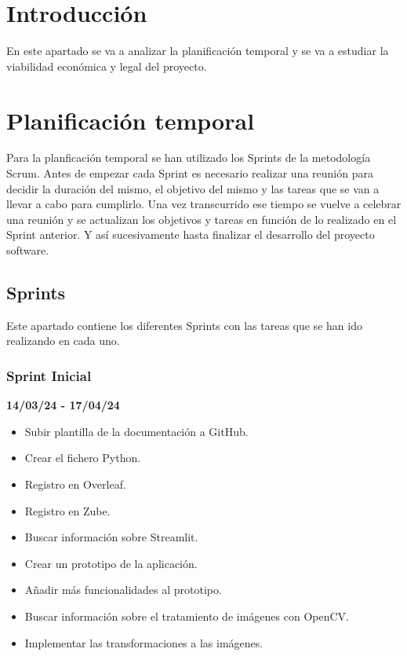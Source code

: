 
\section{Introducción}
En este apartado se va a analizar la planificación temporal y se va a estudiar la viabilidad económica y legal del proyecto.

\section{Planificación temporal}
Para la planficación temporal se han utilizado los Sprints de la metodología Scrum. Antes de empezar cada Sprint es necesario realizar una reunión para decidir la duración del mismo, el objetivo del mismo y las tareas que se van a llevar a cabo para cumplirlo. Una vez transcurrido ese tiempo se vuelve a celebrar una reunión y se actualizan los objetivos y tareas en función de lo realizado en el Sprint anterior. Y así sucesivamente hasta finalizar el desarrollo del proyecto software.

\subsection{Sprints}
Este apartado contiene los diferentes Sprints con las tareas que se han ido realizando en cada uno.

\subsubsection{Sprint Inicial}
\textbf{14/03/24 - 17/04/24}
\begin{itemize}
    \item Subir plantilla de la documentación a GitHub.
    \item Crear el fichero Python.
    \item Registro en Overleaf.
    \item Registro en Zube.
    \item Buscar información sobre Streamlit.
    \item Crear un prototipo de la aplicación.
    \item Añadir más funcionalidades al prototipo.
    \item Buscar información sobre el tratamiento de imágenes con OpenCV.
    \item Implementar las transformaciones a las imágenes.
\end{itemize}

